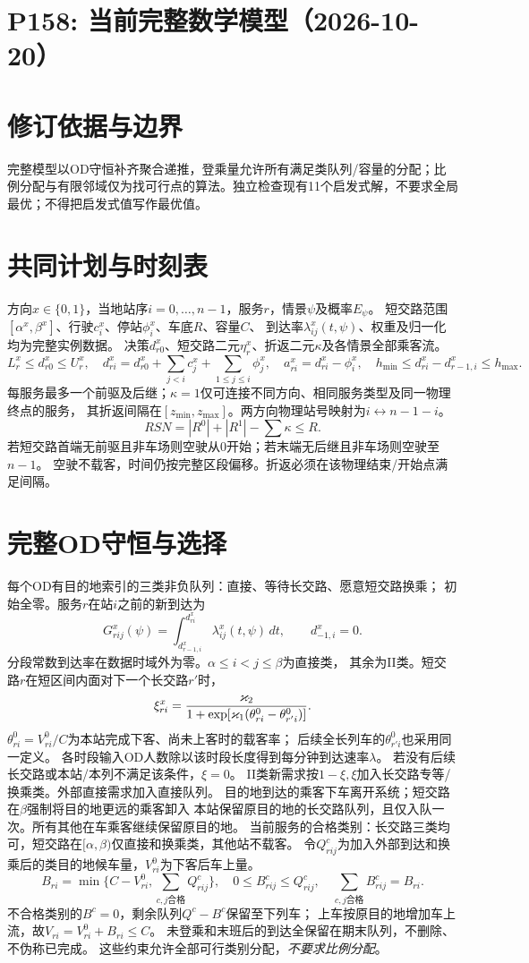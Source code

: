 \documentclass[11pt]{ctexart}
\begin{document}
\section*{P158: 当前完整数学模型（2026-10-20）}
\section*{修订依据与边界}完整模型以OD守恒补齐聚合递推，登乘量允许所有满足类队列/容量的分配；比例分配与有限邻域仅为找可行点的算法。独立检查现有11个启发式解，不要求全局最优；不得把启发式值写作最优值。

\section*{共同计划与时刻表}
方向$x\in\{0,1\}$，当地站序$i=0,\ldots,n-1$，服务$r$，情景$\psi$及概率$E_\psi$。
短交路范围$[\alpha^x,\beta^x]$、行驶$c_i^x$、停站$\phi_i^x$、车底$R$、容量$C$、
到达率$\lambda_{ij}^x(t,\psi)$、权重及归一化均为完整实例数据。
决策$d^x_{r0}$、短交路二元$\eta^x_r$、折返二元$\kappa$及各情景全部乘客流。
\[
L_r^x\le d_{r0}^x\le U_r^x,\quad
d_{ri}^x=d_{r0}^x+\sum_{j<i}c_j^x+\sum_{1\le j\le i}\phi_j^x,\quad
a_{ri}^x=d_{ri}^x-\phi_i^x,\quad
h_{\min}\le d_{ri}^x-d_{r-1,i}^x\le h_{\max}.
\]
每服务最多一个前驱及后继；$\kappa=1$仅可连接不同方向、相同服务类型及同一物理终点的服务，
其折返间隔在$[z_{\min},z_{\max}]$。两方向物理站号映射为$i\leftrightarrow n-1-i$。
\[
RSN=|R^0|+|R^1|-\sum\kappa\le R.
\]
若短交路首端无前驱且非车场则空驶从0开始；若末端无后继且非车场则空驶至$n-1$。
空驶不载客，时间仍按完整区段偏移。折返必须在该物理结束/开始点满足间隔。
\section*{完整OD守恒与选择}
每个OD有目的地索引的三类非负队列：直接、等待长交路、愿意短交路换乘；
初始全零。服务$r$在站$i$之前的新到达为
\[
G^x_{rij}(\psi)=\int_{d^x_{r-1,i}}^{d^x_{ri}}\lambda^x_{ij}(t,\psi)\,dt,\qquad
d^x_{-1,i}=0.
\]
分段常数到达率在数据时域外为零。$\alpha\le i<j\le\beta$为直接类，
其余为II类。短交路$r$在短区间内面对下一个长交路$r'$时，
\[
\xi^x_{ri}={\varkappa_2\over1+\exp[\varkappa_1(\theta^0_{ri}-\theta^0_{r'i})]}.
\]
$\theta^0_{ri}=V^0_{ri}/C$为本站完成下客、尚未上客时的载客率；
后续全长列车的$\theta^0_{r'i}$也采用同一定义。
各时段输入OD人数除以该时段长度得到每分钟到达速率$\lambda$。
若没有后续长交路或本站/本列不满足该条件，$\xi=0$。
II类新需求按$1-\xi,\xi$加入长交路专等/换乘类。外部直接需求加入直接队列。
目的地到达的乘客下车离开系统；短交路在$\beta$强制将目的地更远的乘客卸入
本站保留原目的地的长交路队列，且仅入队一次。所有其他在车乘客继续保留原目的地。
当前服务的合格类别：长交路三类均可，短交路在$[\alpha,\beta)$仅直接和换乘类，其他站不载客。
令$Q^c_{rij}$为加入外部到达和换乘后的类目的地候车量，$V^0_{ri}$为下客后车上量。
\[
B_{ri}=\min\{C-V^0_{ri},\sum_{c,j\text{合格}}Q^c_{rij}\},\quad
0\le B^c_{rij}\le Q^c_{rij},\quad
\sum_{c,j\text{合格}}B^c_{rij}=B_{ri}.
\]
不合格类别的$B^c=0$，剩余队列$Q^c-B^c$保留至下列车；
上车按原目的地增加车上流，故$V_{ri}=V^0_{ri}+B_{ri}\le C$。
未登乘和末班后的到达全保留在期末队列，不删除、不伪称已完成。
这些约束允许全部可行类别分配，\emph{不要求比例分配}。
\end{document}
